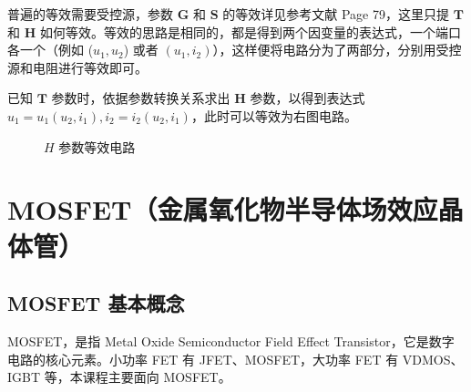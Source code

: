 \documentclass[UTF8]{report}
\theoremstyle{MyLineTheoremStyle} %
\theoremstyle{MyBlockTheoremStyle} %
\theoremstyle{MySubsubsectionStyle} %
\begin{document}
\begin{center}\noindent\begin{minipage}{0.58\columnwidth}
    \hspace*{2em} 普遍的等效需要受控源，参数 $\boldsymbol{G}$ 和 $\boldsymbol{S}$ 的等效详见参考文献 \cite{电路原理} Page 79，这里只提 $\boldsymbol{T}$ 和 $\boldsymbol{H}$ 如何等效。等效的思路是相同的，都是得到两个因变量的表达式，一个端口各一个（例如 ($u_1, u_2$) 或者 $(u_1, i_2)$），这样便将电路分为了两部分，分别用受控源和电阻进行等效即可。

    \hspace*{2em} 已知 $\boldsymbol{T}$ 参数时，依据参数转换关系求出 $\boldsymbol{H}$ 参数，以得到表达式 $u_1 = u_1(u_2,i_1), i_2 = i_2(u_2,i_1)$，此时可以等效为右图电路。
\end{minipage}\hfill\begin{minipage}{0.39\columnwidth}
    \begin{figure}[H]\centering
        
        \caption{$H$ 参数等效电路}\label{H参数等效电路}
    \end{figure}
\end{minipage}\end{center}



\section{MOSFET（金属氧化物半导体场效应晶体管）}

\subsection{MOSFET 基本概念}

MOSFET，是指 Metal Oxide Semiconductor Field Effect Transistor，它是数字电路的核心元素。小功率 FET 有 JFET、MOSFET，大功率 FET 有 VDMOS、IGBT 等，本课程主要面向 MOSFET。
\end{document}
